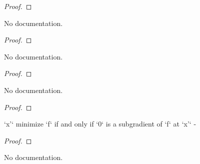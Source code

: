 \begin{proof}
    \leanok
\end{proof}

\begin{theorem}\label{SubderivAt_eq_gradient}
        \leanok
                No documentation.
    \end{theorem}

\begin{proof}
    \leanok
\end{proof}

\begin{theorem}\label{HasSubgradientAt_zero_of_isMinOn}
        \leanok
                No documentation.
    \end{theorem}

\begin{proof}
    \leanok
\end{proof}

\begin{theorem}\label{isMinOn_of_HasSubgradentAt_zero}
        \leanok
                No documentation.
    \end{theorem}

\begin{proof}
    \leanok
\end{proof}

\begin{theorem}\label{HasSubgradientAt_zero_iff_isMinOn}
        \leanok
                `x'` minimize `f` if and only if `0` is a subgradient of `f` at `x'` -
    \end{theorem}

\begin{proof}
    \leanok
\end{proof}

\begin{theorem}\label{HasSubgradientWithinAt_zero_of_isMinOn}
        \leanok
                No documentation.
    \end{theorem}


